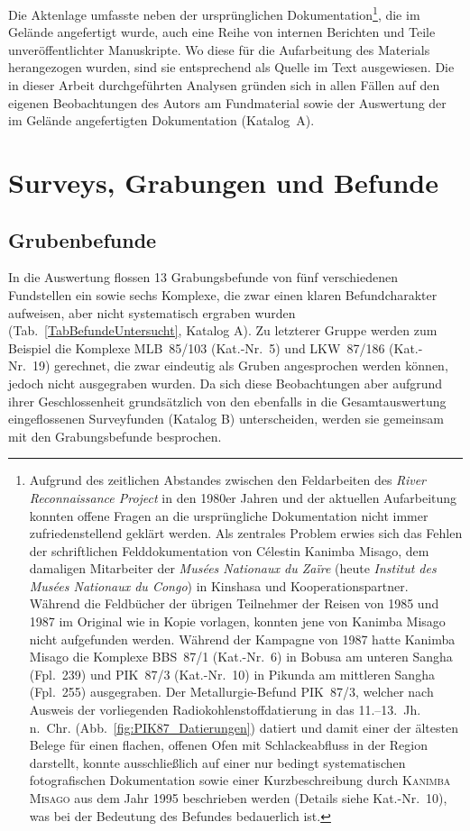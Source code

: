 \begin{multicols}{2}
Die Aktenlage umfasste neben der ursprünglichen Dokumentation\footnote{Aufgrund des zeitlichen Abstandes zwischen den Feldarbeiten des \textit{River Reconnaissance Project} in den 1980er Jahren und der aktuellen Aufarbeitung konnten offene Fragen an die ursprüngliche Dokumentation nicht immer zufriedenstellend geklärt werden. Als zentrales Problem erwies sich das Fehlen der schriftlichen Felddokumentation von Célestin Kanimba Misago, dem damaligen Mitarbeiter der \textit{Musées Nationaux du Zaïre} (heute \textit{Institut des Musées Nationaux du Congo}) in Kinshasa und Kooperationspartner. Während die Feldbücher der übrigen Teilnehmer der Reisen von 1985 und 1987 im Original wie in Kopie vorlagen, konnten jene von Kanimba Misago nicht aufgefunden werden. Während der Kampagne von 1987 hatte Kanimba Misago die Komplexe BBS~87/1 (Kat.-Nr.~6) in Bobusa am unteren \mbox{Sangha} (Fpl.~239) und PIK~87/3 (Kat.-Nr.~10) in Pikunda am mittleren \mbox{Sangha} (Fpl.~255) ausgegraben. Der Metallurgie-Befund PIK~87/3, welcher nach Ausweis der vorliegenden Radiokohlenstoffdatierung in das 11.--13.~Jh. n.~Chr. (Abb.~\ref{fig:PIK87_Datierungen}) datiert und damit einer der ältesten Belege für einen flachen, offenen Ofen mit Schlackeabfluss in der Region darstellt, konnte ausschließlich auf einer nur bedingt systematischen fotografischen Dokumentation sowie einer Kurzbeschreibung durch \textsc{Kanimba Misago} aus dem Jahr 1995 beschrieben werden (Details siehe Kat.-Nr.~10), was bei der Bedeutung des Befundes bedauerlich ist.}, die im Gelände angefertigt wurde, auch eine Reihe von internen Berichten und Teile unveröffentlichter Manuskripte. Wo diese für die Aufarbeitung des Materials herangezogen wurden, sind sie entsprechend als Quelle im Text ausgewiesen. Die in dieser Arbeit durchgeführten Analysen gründen sich in allen Fällen auf den eigenen Beobachtungen des Autors am Fundmaterial sowie der Auswertung der im Gelände angefertigten Dokumentation (Katalog~A).

\section{Surveys, Grabungen und Befunde}\label{sec:GrabungenBefunde}

\subsection{Grubenbefunde}

In die Auswertung flossen 13 Grabungsbefunde von fünf verschiedenen Fundstellen ein sowie sechs Komplexe, die zwar einen klaren Befundcharakter aufweisen, aber nicht systematisch ergraben wurden (Tab.~\ref{TabBefundeUntersucht}, Katalog A). Zu letzterer Gruppe werden zum Beispiel die Komplexe MLB~85/103 (Kat.-Nr.~5) und LKW~87/186 (Kat.-Nr.~19) gerechnet, die zwar eindeutig als Gruben angesprochen werden können, jedoch nicht ausgegraben wurden. Da sich diese Beobachtungen aber aufgrund ihrer Geschlossenheit grundsätzlich von den ebenfalls in die Gesamtauswertung eingeflossenen Surveyfunden (Katalog B) unterscheiden, werden sie gemeinsam mit den Grabungsbefunde besprochen.


\end{multicols}
